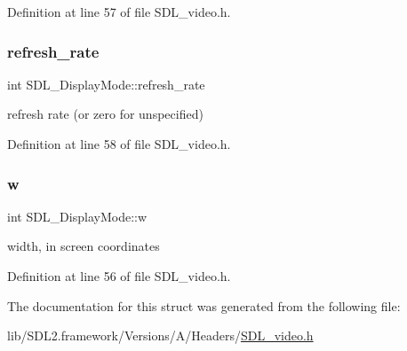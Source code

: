 Definition at line 57 of file S\+D\+L\+\_\+video.\+h.

\mbox{\label{struct_s_d_l___display_mode_ad1b5783c9b292ebf24ad4e0e7a98e540}} 
\subsubsection{\texorpdfstring{refresh\_rate}{refresh\_rate}}
{\footnotesize\ttfamily int S\+D\+L\+\_\+\+Display\+Mode\+::refresh\+\_\+rate}

refresh rate (or zero for unspecified) 

Definition at line 58 of file S\+D\+L\+\_\+video.\+h.

\mbox{\label{struct_s_d_l___display_mode_a504bb5e21950b719a0df43be51199046}} 
\subsubsection{\texorpdfstring{w}{w}}
{\footnotesize\ttfamily int S\+D\+L\+\_\+\+Display\+Mode\+::w}

width, in screen coordinates 

Definition at line 56 of file S\+D\+L\+\_\+video.\+h.



The documentation for this struct was generated from the following file\+:\begin{DoxyCompactItemize}
\item 
lib/\+S\+D\+L2.\+framework/\+Versions/\+A/\+Headers/\mbox{\hyperlink{_s_d_l__video_8h}{S\+D\+L\+\_\+video.\+h}}\end{DoxyCompactItemize}
